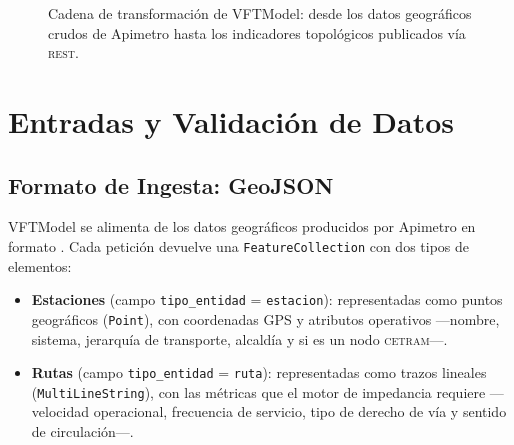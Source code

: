 \begin{figure}[H]
\DIFdelendFL \DIFaddbeginFL {}\DIFaddendFL %
    \caption[Flujo de procesamiento de VFTModel]{Cadena de transformación de
    VFTModel: desde los datos geográficos crudos de Apimetro hasta los
    indicadores topológicos publicados vía \api{} \textsc{rest}.}
    \label{fig:vft-flujo}
\end{figure}

\section{Entradas y Validación de Datos}
\label{sec:vft-entradas}

\subsection{Formato de Ingesta: GeoJSON}
\label{subsec:vft-geojson}

VFTModel se alimenta de los datos geográficos producidos por Apimetro en formato
\geojson{} \parencite{butler2016geojson}. Cada petición devuelve una
\texttt{FeatureCollection} con dos tipos de elementos:

\begin{itemize}
    \item \textbf{Estaciones} (campo \texttt{tipo\_entidad} = \texttt{estacion}): representadas
    como puntos geográficos (\texttt{Point}), con coordenadas GPS y atributos
    operativos —nombre, sistema, jerarquía de transporte, alcaldía y si es un
    nodo \textsc{cetram}—.
    \item \textbf{Rutas} (campo \texttt{tipo\_entidad}\allowbreak{} = \texttt{ruta}): representadas como
    trazos lineales (\texttt{MultiLineString}), con las métricas que el motor de
    impedancia requiere —velocidad operacional, frecuencia de servicio, tipo de
    derecho de vía y sentido de circulación—.
\end{itemize}

